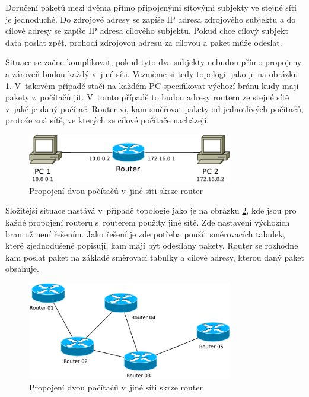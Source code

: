 \documentclass[thesis=M,czech]{src/FITthesis}[2019/12/23]
\begin{document}
Doručení paketů mezi dvěma přímo připojenými síťovými subjekty ve stejné síti je jednoduché. Do zdrojové adresy se zapíše IP adresa zdrojového subjektu a do cílové adresy se zapíše IP adresa cílového subjektu. Pokud chce cílový subjekt data poslat zpět, prohodí zdrojovou adresu za cílovou a paket může odeslat. 

Situace se začne komplikovat, pokud tyto dva subjekty nebudou přímo propojeny a zároveň budou každý v~jiné síti. Vezměme si tedy topologii jako je na obrázku \ref{fig:IProuting}. V~takovém případě stačí na každém PC specifikovat výchozí bránu kudy mají pakety z~počítačů jít. V~tomto případě to budou adresy routeru ze stejné sítě v~jaké je daný počítač. Router ví, kam směřovat pakety od jednotlivých počítačů, protože zná sítě, ve kterých se cílové počítače nacházejí. 

\begin{figure}[ht]
  \centering
   \includegraphics[width=0.8\textwidth]{images/ip_routing.pdf}
   \caption{Propojení dvou počítačů v~jiné síti skrze router}
     \label{fig:IProuting}
\end{figure}

Složitější situace nastává v~případě topologie jako je na obrázku \ref{fig:IProuting2}, kde jsou pro každé propojení routeru s~routerem  použity jiné sítě. Zde nastavení výchozích bran už není řešením. Jako řešení je zde potřeba použít směrovacích tabulek, které zjednodušeně popisují, kam mají být odesílány pakety. Router se rozhodne kam poslat paket na základě směrovací tabulky a cílové adresy, kterou daný paket obsahuje. 

\begin{figure}[ht]
  \centering
   \includegraphics[width=0.8\textwidth]{images/ip_routing2.pdf}
   \caption{Propojení dvou počítačů v~jiné síti skrze router}
     \label{fig:IProuting2}
\end{figure}
\end{document}
